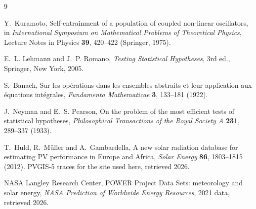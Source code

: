 \documentclass[10pt,twocolumn,a4paper]{article}
\theoremstyle{definition}
\theoremstyle{remark}
\begin{document}
\small
\begin{thebibliography}{9}

Y.~Kuramoto,
\newblock Self-entrainment of a population of coupled non-linear oscillators,
\newblock in \emph{International Symposium on Mathematical Problems of
Theoretical Physics}, Lecture Notes in Physics \textbf{39}, 420--422 (Springer,
1975).

E.~L. Lehmann and J.~P. Romano,
\newblock \emph{Testing Statistical Hypotheses}, 3rd ed.,
\newblock Springer, New York, 2005.

S.~Banach,
\newblock Sur les op\'erations dans les ensembles abstraits et leur application
aux \'equations int\'egrales,
\newblock \emph{Fundamenta Mathematicae} \textbf{3}, 133--181 (1922).

J.~Neyman and E.~S. Pearson,
\newblock On the problem of the most efficient tests of statistical hypotheses,
\newblock \emph{Philosophical Transactions of the Royal Society A}
\textbf{231}, 289--337 (1933).

T.~Huld, R.~M\"uller and A.~Gambardella,
\newblock A new solar radiation database for estimating PV performance in Europe
and Africa,
\newblock \emph{Solar Energy} \textbf{86}, 1803--1815 (2012).
\newblock PVGIS-5 traces for the site used here, retrieved 2026.

NASA Langley Research Center,
\newblock POWER Project Data Sets: meteorology and solar energy,
\newblock \emph{NASA Prediction of Worldwide Energy Resources}, 2021 data,
retrieved 2026.

\end{thebibliography}
\end{document}
